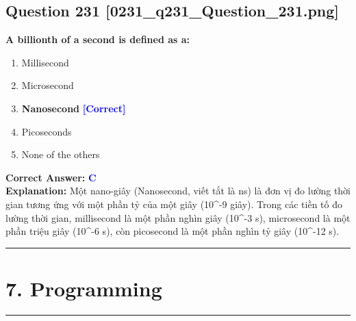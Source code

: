 \documentclass[11pt,a4paper]{article}
\begin{document}
\begin{minipage}{\textwidth}
\subsection*{Question 231 \quad \footnotesize{[0231\_q231\_Question\_231.png]}}
\noindent \textbf{A billionth of a second is defined as a:}

\begin{enumerate}[label=\Alph*.]
    \item Millisecond
    \item Microsecond
    \item \textbf{Nanosecond} \hfill \textcolor{blue}{\textbf{[Correct]}}
    \item Picoseconds
    \item None of the others
\end{enumerate}

\noindent \textbf{Correct Answer:} \textcolor{blue}{\textbf{C}} \\[2pt]
\noindent \textbf{Explanation:} Một nano-giây (Nanosecond, viết tắt là ns) là đơn vị đo lường thời gian tương ứng với một phần tỷ của một giây (10\textasciicircum{}-9 giây). Trong các tiền tố đo lường thời gian, millisecond là một phần nghìn giây (10\textasciicircum{}-3 s), microsecond là một phần triệu giây (10\textasciicircum{}-6 s), còn picosecond là một phần nghìn tỷ giây (10\textasciicircum{}-12 s).

\par\vspace{0.3cm}
\hrule
\vspace{0.3cm}
\end{minipage}


\newpage
\section*{7. Programming}
\hrule\vspace{0.5cm}
\end{document}
